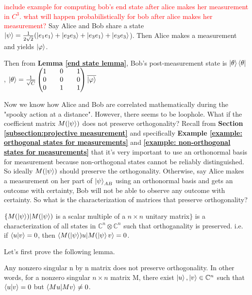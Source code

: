 \begin{example}
\textcolor{red}{include example for computing bob's end state after alice makes her measurement in $C^3$. what will happen probabilistically for bob after alice makes her measurement?}
Say Alice and Bob share a state $\ket{\psi}=\frac{1}{2\sqrt{2}}(\ket{e_1 e_1}+\ket{e_2 e_3}+\ket{e_3 e_1}+\ket{e_3 e_3}$). Then Alice makes a measurement and yields $\ket{\varphi}$. 

Then from \textbf{Lemma \ref{end state lemma}}, Bob's post-measurement state is $\ket{\theta}\bra{\theta}$, $\ket{\theta}=\frac{1}{\sqrt{C}}\begin{pmatrix}
1 && 0 && 1\\
0 && 0 && 0\\
0 && 1 && 1\\
\end{pmatrix}\overline{\ket{\varphi}}$
\end{example}

\bigskip
Now we know how Alice and Bob are correlated mathematically during the "spooky action at a distance". However, there seems to be loophole. What if the coefficient matrix $M(\ket{\psi})$ does not preserve orthogonality? Recall from \textbf{Section \ref{subsection:projective measurement}} and specifically \textbf{Example \ref{example: orthogonal states for measurements}} and \textbf{\ref{example: non-orthogonal states for measurements}} that it's very important to use an orthonormal basis for measurement because non-orthogonal states cannot be reliably distinguished.
So ideally $M(\ket{\psi})$ should preserve the orthogonality. Otherwise, say Alice makes a measurement on her part of $\ket{\psi}_{AB}$ using an orthonormal basis and gets an outcome with certainty, Bob will not be able to observe any outcome with certainty. So what is the characterization of matrices that preserve orthogonality?

\begin{prop} \label{orthogonality preserving character}
$\{M(\ket{\psi})|M(\ket{\psi})$ is a scalar multiple of a $n \times n$ unitary matrix$\}$ is a characterization of all states in $\mathbb{C}^n \otimes \mathbb{C}^n$ such that orthoganality is preserved. i.e. if $\braket{u|v}=0$, then $\braket{M(\ket{\psi})u|M(\ket{\psi}v}=0$.
\end{prop}

Let's first prove the following lemma.

\begin{lemma}
Any nonzero singular n by n matrix does not preserve orthogonality. In other words, for a nonzero singular $n \times n$ matrix M, there exist $\ket{u}, \ket{v} \in \mathbb{C}^n$ such that $\braket{u|v}=0$ but $\braket{Mu|Mv} \ne 0$.
\end{lemma}

